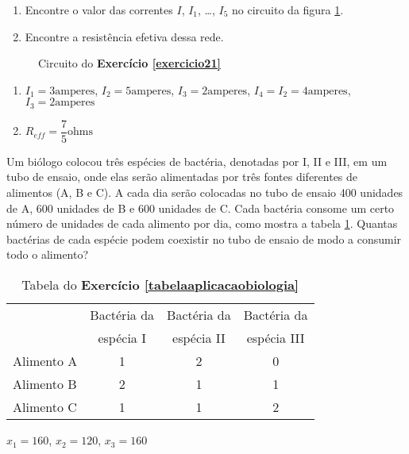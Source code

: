 \documentclass[12pt]{exam}
\begin{document}
\begin{exercicio}\label{exercicio21}
  \begin{enumerate}[label={\alph*})]
    \item Encontre o valor das correntes $I$, $I_1$, \dots, $I_5$ no circuito da figura \ref{exercicio21circuitopoole}.
    \item Encontre a resistência efetiva dessa rede.
  \end{enumerate}
  \begin{figure}
    \centering
    
    \caption{Circuito do \textbf{Exercício \ref{exercicio21}}}
    \label{exercicio21circuitopoole}
  \end{figure}
  \begin{solucao}
    \begin{enumerate}[label={\alph*})]
      \item $I_1 = 3 \mbox{amperes}$, $I_2 = 5 \mbox{amperes}$, $I_3 = 2 \mbox{amperes}$, $I_4 = I_2 =  4\mbox{amperes}$, $I_3 = 2 \mbox{amperes}$
      \item $R_{eff} = \dfrac{7}{5} \mbox{ohms}$
    \end{enumerate}
  \end{solucao}
\end{exercicio}

\begin{exercicio}\label{tabelaaplicacaobiologia}
  Um biólogo colocou três espécies de bactéria, denotadas por I, II e III, em um tubo de ensaio, onde elas serão alimentadas por três fontes diferentes de alimentos (A, B e C). A cada dia serão colocadas no tubo de ensaio 400 unidades de A, 600 unidades de B e 600 unidades de C. Cada bactéria consome um certo número de unidades de cada alimento por dia, como mostra a tabela \ref{tabelabacterias}. Quantas bactérias de cada espécie podem coexistir no tubo de ensaio de modo a consumir todo o alimento?
  \begin{table}[!h]
    \begin{center}
      \begin{tabular}{lccc}
        & Bactéria da & Bactéria da & Bactéria da \\
        & espécia I & espécia II & espécia III\\
        \hline
        Alimento A & 1 & 2 & 0\\
        Alimento B & 2 & 1 & 1\\
        Alimento C & 1 & 1 & 2\\
        \hline
      \end{tabular}
      \caption{Tabela do \textbf{Exercício \ref{tabelaaplicacaobiologia}}}
      \label{tabelabacterias}
    \end{center}
  \end{table}
  \begin{solucao}
    $x_1 = 160$, $x_2 = 120$, $x_3 = 160$
  \end{solucao}
\end{exercicio}
\end{document}
